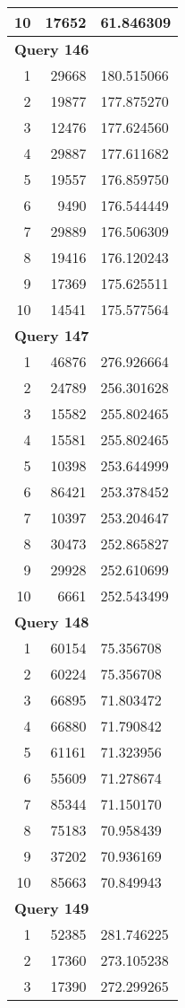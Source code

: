 \begin{longtable}[{p}]{@{}rrp{}@{}}
10 & 17652 & 61.846309 \\
\midrule
\multicolumn{3}{l}{\bfseries Query 146} \\
1 & 29668 & 180.515066 \\
2 & 19877 & 177.875270 \\
3 & 12476 & 177.624560 \\
4 & 29887 & 177.611682 \\
5 & 19557 & 176.859750 \\
6 & 9490 & 176.544449 \\
7 & 29889 & 176.506309 \\
8 & 19416 & 176.120243 \\
9 & 17369 & 175.625511 \\
10 & 14541 & 175.577564 \\
\midrule
\multicolumn{3}{l}{\bfseries Query 147} \\
1 & 46876 & 276.926664 \\
2 & 24789 & 256.301628 \\
3 & 15582 & 255.802465 \\
4 & 15581 & 255.802465 \\
5 & 10398 & 253.644999 \\
6 & 86421 & 253.378452 \\
7 & 10397 & 253.204647 \\
8 & 30473 & 252.865827 \\
9 & 29928 & 252.610699 \\
10 & 6661 & 252.543499 \\
\midrule
\multicolumn{3}{l}{\bfseries Query 148} \\
1 & 60154 & 75.356708 \\
2 & 60224 & 75.356708 \\
3 & 66895 & 71.803472 \\
4 & 66880 & 71.790842 \\
5 & 61161 & 71.323956 \\
6 & 55609 & 71.278674 \\
7 & 85344 & 71.150170 \\
8 & 75183 & 70.958439 \\
9 & 37202 & 70.936169 \\
10 & 85663 & 70.849943 \\
\midrule
\multicolumn{3}{l}{\bfseries Query 149} \\
1 & 52385 & 281.746225 \\
2 & 17360 & 273.105238 \\
3 & 17390 & 272.299265 \\

\end{longtable}
